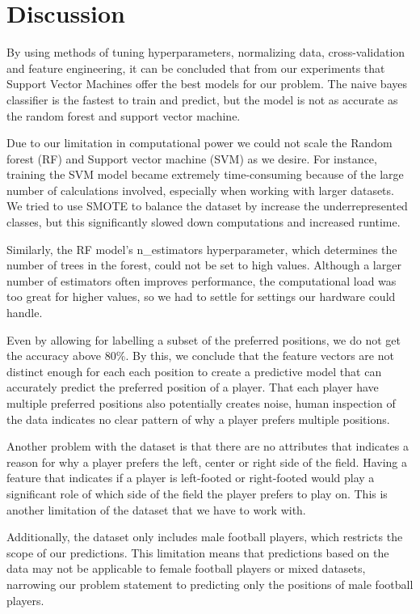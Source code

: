 \section{Discussion}

By using methods of tuning hyperparameters, normalizing data, cross-validation and feature engineering, it can be concluded that from our experiments that Support Vector Machines offer the best models for our problem. The naive bayes classifier is the fastest to train and predict, but the model is not as accurate as the random forest and support vector machine. 
\par
Due to our limitation in computational power we could not scale the Random forest (RF) and Support vector machine (SVM) as we desire. 
For instance, training the SVM model became extremely time-consuming because of the large number of calculations involved, especially when working with larger datasets. 
We tried to use SMOTE to balance the dataset by increase the underrepresented classes, but this significantly slowed down computations and increased runtime.
\par
Similarly, the RF model's n\_estimators hyperparameter, which determines the number of trees in the forest, could not be set to high values. 
Although a larger number of estimators often improves performance, the computational load was too great for higher values, so we had to settle for settings our hardware could handle.
\par
Even by allowing for labelling a subset of the preferred positions, we do not get the accuracy above $80\%$. By this, we conclude that the feature vectors are not distinct enough for each each position to create a predictive model that can accurately predict the preferred position of a player. That each player have multiple preferred positions also potentially creates noise, human inspection of the data indicates no clear pattern of why a player prefers multiple positions.
\par
Another problem with the dataset is that there are no attributes that indicates a reason for why a player prefers the left, center or right side of the field. Having a feature that indicates if a player is left-footed or right-footed would play a significant role of which side of the field the player prefers to play on. This is another limitation of the dataset that we have to work with. 
\par 
Additionally, the dataset only includes male football players, which restricts the scope of our predictions.
This limitation means that predictions based on the data may not be applicable to female football players or mixed datasets, narrowing our problem statement to predicting only the positions of male football players.
